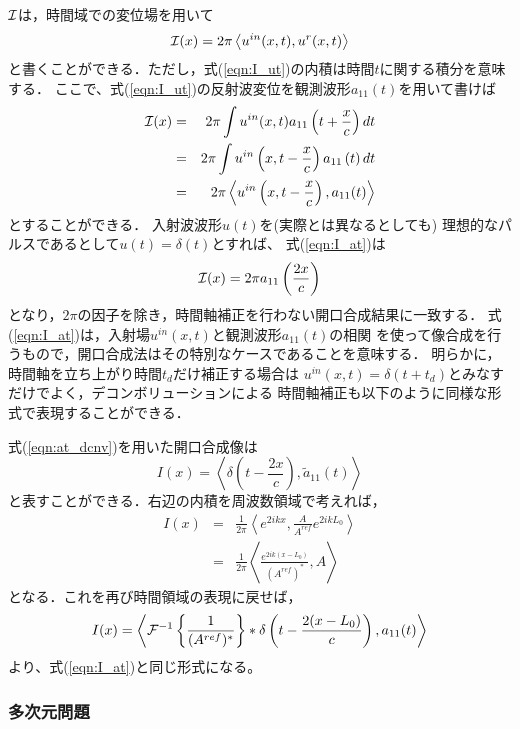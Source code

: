 \documentclass[10pt,a4j,dvipdfmx]{jarticle}
\begin{document}
${\cal I}$は，時間域での変位場を用いて
\begin{equation}
	{\cal I}(x)= 2\pi \left< u^{in}(x,t), u^{r}(x,t)\right>
	\label{eqn:I_ut}
\end{equation}
と書くことができる．ただし，式(\ref{eqn:I_ut})の内積は時間$t$に関する積分を意味する．
ここで、式(\ref{eqn:I_ut})の反射波変位を観測波形$a_{11}(t)$を用いて書けば
\begin{eqnarray}
	{\cal I}(x) &= & 
	2\pi \int u^{in}(x,t) a_{11}\left(t+\frac{x}{c}\right) dt
	\\
	&=&
	2\pi \int u^{in}\left(x,t-\frac{x}{c}\right) a_{11}\left(t\right) dt \\
	&=&
	2\pi \left< u^{in}\left(x,t-\frac{x}{c}\right), a_{11}(t) \right>
	\label{eqn:I_at}
\end{eqnarray}
とすることができる．
入射波波形$u(t)$を(実際とは異なるとしても)
理想的なパルスであるとして$u(t)=\delta(t)$とすれば、
式(\ref{eqn:I_at})は
\begin{equation}
	{\cal I}(x)=2\pi a_{11}\left(\frac{2x}{c}\right)
	\label{eqn:}
\end{equation}
となり，$2\pi$の因子を除き，時間軸補正を行わない開口合成結果に一致する．
式(\ref{eqn:I_at})は，入射場$u^{in}(x,t)$と観測波形$a_{11}(t)$の相関
を使って像合成を行うもので，開口合成法はその特別なケースであることを意味する．
明らかに，時間軸を立ち上がり時間$t_d$だけ補正する場合は
$u^{in}(x,t)=\delta(t+t_d)$とみなすだけでよく，デコンボリューションによる
時間軸補正も以下のように同様な形式で表現することができる．

式(\ref{eqn:at_dcnv})を用いた開口合成像は
\begin{equation}
	I(x)=\left< \delta\left(t-\frac{2x}{c}\right), \tilde a_{11}(t) \right>
	\label{eqn:}
\end{equation}
と表すことができる．右辺の内積を周波数領域で考えれば，
\begin{eqnarray}
	I(x) &=&
	\frac{1}{2\pi}\left< e^{2ikx}, \frac{A}{A^{ref}}e^{2ikL_0} \right> \\
	&=&
	\frac{1}{2\pi}\left< \frac{e^{2ik(x-L_0)}}{(A^{ref})^*}, A \right> 
	\label{eqn:}
\end{eqnarray}
となる．これを再び時間領域の表現に戻せば，
\begin{equation}
	I(x)= \left< {\cal F}^{-1}\left\{ \frac{1}{(A^{ref})^*}\right\} *\delta \left( t-\frac{2(x-L_0)}{c}\right), a_{11}(t) \right>
	\label{eqn:Ix_dcnv}
\end{equation}
より、式(\ref{eqn:I_at})と同じ形式になる。
\subsubsection{多次元問題}
\end{document}
